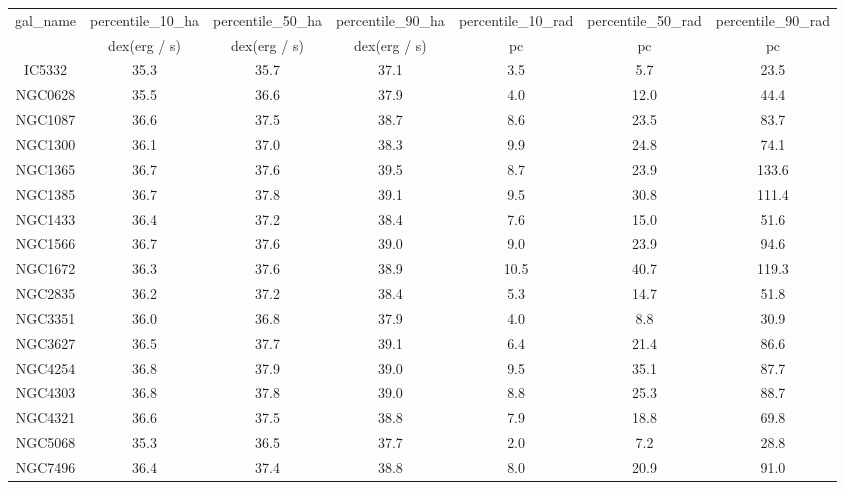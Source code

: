 \begin{table}
\begin{tabular}{ccccccc}
gal_name & percentile_10_ha & percentile_50_ha & percentile_90_ha & percentile_10_rad & percentile_50_rad & percentile_90_rad \\
 & dex(erg / s) & dex(erg / s) & dex(erg / s) & $\mathrm{pc}$ & $\mathrm{pc}$ & $\mathrm{pc}$ \\
IC5332 & 35.3 & 35.7 & 37.1 & 3.5 & 5.7 & 23.5 \\
NGC0628 & 35.5 & 36.6 & 37.9 & 4.0 & 12.0 & 44.4 \\
NGC1087 & 36.6 & 37.5 & 38.7 & 8.6 & 23.5 & 83.7 \\
NGC1300 & 36.1 & 37.0 & 38.3 & 9.9 & 24.8 & 74.1 \\
NGC1365 & 36.7 & 37.6 & 39.5 & 8.7 & 23.9 & 133.6 \\
NGC1385 & 36.7 & 37.8 & 39.1 & 9.5 & 30.8 & 111.4 \\
NGC1433 & 36.4 & 37.2 & 38.4 & 7.6 & 15.0 & 51.6 \\
NGC1566 & 36.7 & 37.6 & 39.0 & 9.0 & 23.9 & 94.6 \\
NGC1672 & 36.3 & 37.6 & 38.9 & 10.5 & 40.7 & 119.3 \\
NGC2835 & 36.2 & 37.2 & 38.4 & 5.3 & 14.7 & 51.8 \\
NGC3351 & 36.0 & 36.8 & 37.9 & 4.0 & 8.8 & 30.9 \\
NGC3627 & 36.5 & 37.7 & 39.1 & 6.4 & 21.4 & 86.6 \\
NGC4254 & 36.8 & 37.9 & 39.0 & 9.5 & 35.1 & 87.7 \\
NGC4303 & 36.8 & 37.8 & 39.0 & 8.8 & 25.3 & 88.7 \\
NGC4321 & 36.6 & 37.5 & 38.8 & 7.9 & 18.8 & 69.8 \\
NGC5068 & 35.3 & 36.5 & 37.7 & 2.0 & 7.2 & 28.8 \\
NGC7496 & 36.4 & 37.4 & 38.8 & 8.0 & 20.9 & 91.0 \\
\end{tabular}
\end{table}
